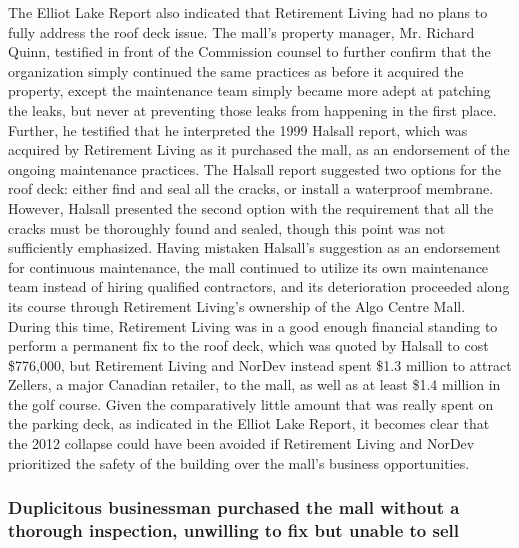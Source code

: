 \documentclass[12pt]{article}
\begin{document}
The Elliot Lake Report also indicated that Retirement Living had no plans to fully address the roof deck issue. The mall's property manager, Mr. Richard Quinn, testified in front of the Commission counsel to further confirm that the organization simply continued the same practices as before it acquired the property, except the maintenance team simply became more adept at patching the leaks, but never at preventing those leaks from happening in the first place. Further, he testified that he interpreted the 1999 Halsall report, which was acquired by Retirement Living as it purchased the mall, as an endorsement of the ongoing maintenance practices. The Halsall report suggested two options for the roof deck: either find and seal all the cracks, or install a waterproof membrane. However, Halsall presented the second option with the requirement that all the cracks must be thoroughly found and sealed, though this point was not sufficiently emphasized. Having mistaken Halsall's suggestion as an endorsement for continuous maintenance, the mall continued to utilize its own maintenance team instead of hiring qualified contractors, and its deterioration proceeded along its course through Retirement Living's ownership of the Algo Centre Mall. During this time, Retirement Living was in a good enough financial standing to perform a permanent fix to the roof deck, which was quoted by Halsall to cost \$776,000, but Retirement Living and NorDev instead spent \$1.3 million to attract Zellers, a major Canadian retailer, to the mall, as well as at least \$1.4 million in the golf course. Given the comparatively little amount that was really spent on the parking deck, as indicated in the Elliot Lake Report, it becomes clear that the 2012 collapse could have been avoided if Retirement Living and NorDev prioritized the safety of the building over the mall's business opportunities.

\subsubsection{Duplicitous businessman purchased the mall without a thorough inspection, unwilling to fix but unable to sell}
\end{document}
